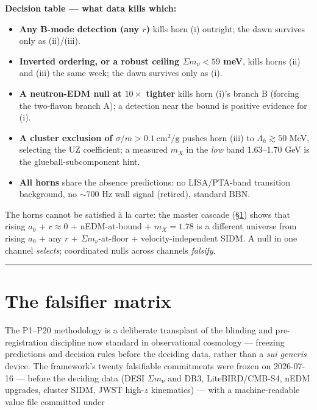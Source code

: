 \documentclass[submission, Phys]{SciPost}
\providecommand{\tightlist}{\setlength{\itemsep}{0pt}\setlength{\parskip}{0pt}}
\begin{document}
\textbf{Decision table --- what data kills which:}

\begin{itemize}
\tightlist
\item
  \textbf{Any B-mode detection (any \(r\))} kills horn (i) outright; the
  dawn survives only as (ii)/(iii).
\item
  \textbf{Inverted ordering, or a robust ceiling \(\Sigma m_\nu < 59\)
  meV}, kills horns (ii) and (iii) the same week; the dawn survives only
  as (i).
\item
  \textbf{A neutron-EDM null at \(10\times\) tighter} kills horn (i)'s
  branch B (forcing the two-flavon branch A); a detection near the bound
  is positive evidence for (i).
\item
  \textbf{A cluster exclusion of \(\sigma/m > 0.1\ \mathrm{cm^2/g}\)}
  pushes horn (iii) to \(\Lambda_h\gtrsim 50\) MeV, selecting the UZ
  coefficient; a measured \(m_X\) in the \emph{low} band 1.63--1.70 GeV
  is the glueball-subcomponent hint.
\item
  \textbf{All horns} share the absence predictions: no LISA/PTA-band
  transition background, no \(\sim 700\) Hz wall signal (retired),
  standard BBN.
\end{itemize}

The horns cannot be satisfied à la carte: the master cascade
(§\ref{sec-9}) shows that rising \(a_0\) + \(r\approx 0\) +
nEDM-at-bound + \(m_X = 1.78\) is a different universe from rising
\(a_0\) + any \(r\) + \(\Sigma m_\nu\)-at-floor + velocity-independent
SIDM. A null in one channel \emph{selects}; coordinated nulls across
channels \emph{falsify}.

\begin{center}\rule{0.5\linewidth}{0.5pt}\end{center}

\section{The falsifier matrix}\label{sec-9}

The P1--P20 methodology is a deliberate transplant of the blinding and
pre-registration discipline now standard in observational cosmology
\cite{DES:2019zlw, DESI:2024wki} --- freezing predictions and decision
rules before the deciding data, rather than a \emph{sui generis} device.
The framework's twenty falsifiable commitments were frozen on 2026-07-16
--- before the deciding data (DESI \(\Sigma m_\nu\) and DR3,
LiteBIRD/CMB-S4, nEDM upgrades, cluster SIDM, JWST high-\(z\)
kinematics) --- with a machine-readable value file committed under
\end{document}
